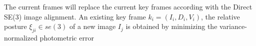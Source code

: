 \iffalse
The current frames will replace the current key frames according with the Direct SE(3) image alignment. An existing key frame ${k_i} = ({I_i},{D_i},{V_i})$, the relative posture ${\xi _{ji}} \in se(3)$ of a new image ${I_j}$ is obtained by minimizing the variance-normalized photometric error

